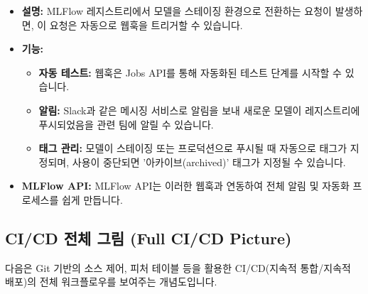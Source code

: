 \documentclass[11pt,a4paper]{article}
\theoremstyle{definition}
\begin{document}
\begin{itemize}
    \item \textbf{설명:} MLFlow 레지스트리에서 모델을 스테이징 환경으로 전환하는 요청이 발생하면, 이 요청은 자동으로 웹훅을 트리거할 수 있습니다.
    \item \textbf{기능:}
    \begin{itemize}
        \item \textbf{자동 테스트:} 웹훅은 Jobs API를 통해 자동화된 테스트 단계를 시작할 수 있습니다.
        \item \textbf{알림:} Slack과 같은 메시징 서비스로 알림을 보내 새로운 모델이 레지스트리에 푸시되었음을 관련 팀에 알릴 수 있습니다.
        \item \textbf{태그 관리:} 모델이 스테이징 또는 프로덕션으로 푸시될 때 자동으로 태그가 지정되며, 사용이 중단되면 '아카이브(archived)' 태그가 지정될 수 있습니다.
    \end{itemize}
    \item \textbf{MLFlow API:} MLFlow API는 이러한 웹훅과 연동하여 전체 알림 및 자동화 프로세스를 쉽게 만듭니다.
\end{itemize}

\subsection{CI/CD 전체 그림 (Full CI/CD Picture)}

다음은 Git 기반의 소스 제어, 피처 테이블 등을 활용한 CI/CD(지속적 통합/지속적 배포)의 전체 워크플로우를 보여주는 개념도입니다.
\end{document}
